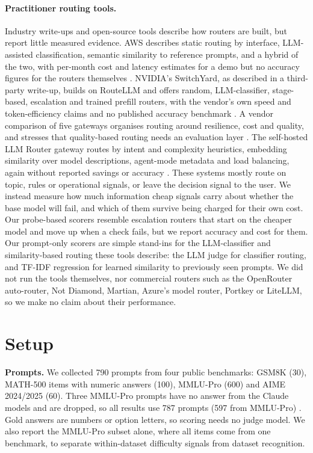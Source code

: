\documentclass[11pt]{article}
\begin{document}
\paragraph{Practitioner routing tools.} Industry write-ups and open-source tools describe how routers are built, but report little measured evidence. AWS describes static routing by interface, LLM-assisted classification, semantic similarity to reference prompts, and a hybrid of the two, with per-month cost and latency estimates for a demo but no accuracy figures for the routers themselves \cite{aws2024multillm}. NVIDIA's SwitchYard, as described in a third-party write-up, builds on RouteLLM and offers random, LLM-classifier, stage-based, escalation and trained prefill routers, with the vendor's own speed and token-efficiency claims and no published accuracy benchmark \cite{mindstudio_switchyard}. A vendor comparison of five gateways organises routing around resilience, cost and quality, and stresses that quality-based routing needs an evaluation layer \cite{braintrust2026routers}. The self-hosted LLM Router gateway routes by intent and complexity heuristics, embedding similarity over model descriptions, agent-mode metadata and load balancing, again without reported savings or accuracy \cite{llmrouter_cloud}. These systems mostly route on topic, rules or operational signals, or leave the decision signal to the user. We instead measure how much information cheap signals carry about whether the base model will fail, and which of them survive being charged for their own cost. Our probe-based scorers resemble escalation routers that start on the cheaper model and move up when a check fails, but we report accuracy and cost for them. Our prompt-only scorers are simple stand-ins for the LLM-classifier and similarity-based routing these tools describe: the LLM judge for classifier routing, and TF-IDF regression for learned similarity to previously seen prompts. We did not run the tools themselves, nor commercial routers such as the OpenRouter auto-router, Not Diamond, Martian, Azure's model router, Portkey or LiteLLM, so we make no claim about their performance.

\section{Setup}
\textbf{Prompts.} We collected 790 prompts from four public benchmarks: GSM8K (30), MATH-500 items with numeric answers (100), MMLU-Pro (600) and AIME 2024/2025 (60). Three MMLU-Pro prompts have no answer from the Claude models and are dropped, so all results use 787 prompts (597 from MMLU-Pro) \cite{cobbe2021gsm8k,hendrycks2021math,lightman2024verify,wang2024mmlupro,maa_aime}. Gold answers are numbers or option letters, so scoring needs no judge model. We also report the MMLU-Pro subset alone, where all items come from one benchmark, to separate within-dataset difficulty signals from dataset recognition.
\end{document}
